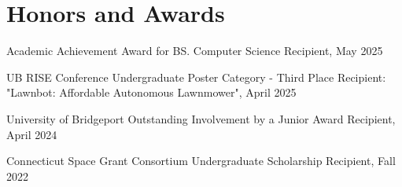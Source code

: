 \section{Honors and Awards}
	\vspace{0.10 cm}
    	\begin{onecolentry}
    		\begin{highlights}
        	\item Academic Achievement Award for BS. Computer Science Recipient, May 2025
			\item UB RISE Conference Undergraduate Poster Category - Third Place Recipient: "Lawnbot: Affordable Autonomous Lawnmower", April 2025
        	\item University of Bridgeport Outstanding Involvement by a Junior Award Recipient, April 2024
        	\item Connecticut Space Grant Consortium Undergraduate Scholarship Recipient, Fall 2022
        	\end{highlights}
    	\end{onecolentry}